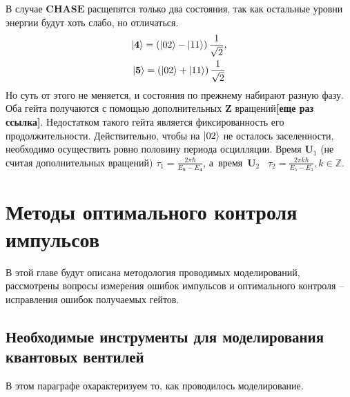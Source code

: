 \documentclass[12pt, twoside]{report}
\DeclarePairedDelimiter\ket{\lvert}{\rangle}
\numberwithin{equation}{section}
\numberwithin{figure}{section}
\begin{document}
\newline{}
\newline{}
В случае $\mathbf{CHASE}$ расщепятся только два состояния, так как остальные уровни энергии будут хоть слабо, но отличаться. 
\begin{gather*}
\ket{\mathbf{4}}  = \left( \ket{02} - \ket{11} \right) \frac{1}{\sqrt{2}}, \\
\ket{\mathbf{5}}  = \left( \ket{02} + \ket{11} \right) \frac{1}{\sqrt{2}}
\end{gather*}
Но суть от этого не меняется, и состояния по прежнему набирают разную фазу. Оба гейта получаются с помощью дополнительных $\mathbf{Z}$ вращений\textbf{[еще раз ссылка]}. Недостатком такого гейта является фиксированность его продолжительности. Действительно, чтобы на $\ket{02}$ не осталось заселенности, необходимо осуществить ровно половину периода осцилляции. Время $\mathbf{U}_1$ (не считая дополнительных вращений) $\tau_1 = \frac{2 \pi \hbar }{E_\mathbf{5} - E_\mathbf{4}}$, а~время~$\mathbf{U}_2$~ $\tau_2 = \frac{2 \pi k \hbar}{E_5 - E_3}, k \in \mathbb{Z}$.

\chapter{Методы оптимального контроля импульсов}
В этой главе будут описана методология проводимых моделирований, рассмотрены вопросы измерения ошибок импульсов и оптимального контроля -- исправления ошибок получаемых гейтов.
\section{Необходимые инструменты для моделирования квантовых вентилей}
В этом параграфе охарактеризуем то, как проводилось моделирование.
\end{document}
